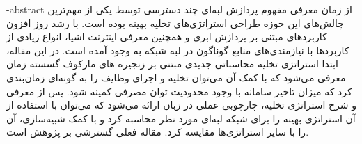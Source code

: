 \esalatPage
\mojavezPage

 \newpage

% 
% 
% 
% 
% 
% 
\fa-abstract{
از زمان معرفی مفهوم پردازش لبه‌ای چند دسترسی توسط  یکی از مهم‌ترین چالش‌های این حوزه طراحی استراتژی‌های تخلیه بهینه بوده است. با رشد روز افزون کاربردهای مبتنی بر پردازش ابری و همچنین معرفی اینترنت اشیا، انواع زیادی از کاربردها با نیازمندی‌های منابع گوناگون در لبه شبکه به وجود آمده است. در این مقاله، ابتدا استراتژی تخلیه محاسباتی جدیدی مبتنی بر زنجیره ‌های مارکوف گسسته-زمان معرفی می‌شود که با کمک آن می‌توان تخلیه و اجرای وظایف را به گونه‌ای زمان‌بندی کرد که میزان تاخیر سامانه با وجود محدودیت توان مصرفی کمینه شود. پس از معرفی و شرح استراتژی تخلیه، چارچوبی عملی در زبان  ارائه می‌شود که می‌توان با استفاده از آن استراتژی بهینه را برای شبکه لبه‌ای مورد نظر محاسبه کرد و با کمک شبیه‌سازی، آن را با سایر استراتژی‌ها مقایسه کرد. مقاله فعلی گسترشی بر پژوهش \cite{Liu} است.
}

\abstractPage

\newpage\clearpage